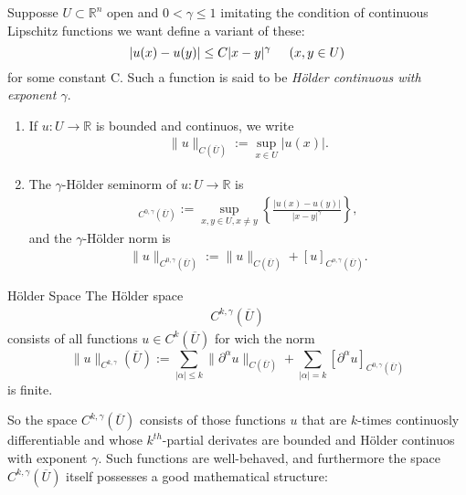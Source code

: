 Supposse $U\subset \mathbb{R}^{n}$ open and $0<\gamma\leq 1$ imitating the condition of continuous Lipschitz functions we want define a variant of these:
\begin{equation}
  |u(x)-u(y)|\leq C|x-y|^{\gamma}\hspace{0.5cm}(x,y\in U)\label{eq:holder_condition}
\end{equation}
for some constant C. Such a function is said to be \textit{Hölder continuous with exponent $\gamma$}.
\begin{definition}{}
  \begin{enumerate}
    \item If $u:U\to \mathbb{R}$ is bounded and continuos, we write
      \begin{align*}
        \|u\|_{C(\overline{U})}:=\sup_{x\in U}|u(x)|.
      \end{align*}
    \item The $\gamma$-Hölder seminorm of $u:U\to\mathbb{R}$ is
      \begin{align*}
        [u]_{C^{0,\gamma}(\overline{U})}:=\sup_{x,y\in U, x\neq y}\left\{\frac{|u(x)-u(y)|}{|x-y|^{\gamma}}\right\},
      \end{align*}
      and the $\gamma$-Hölder norm is
      \begin{align*}
        \|u\|_{C^{0,\gamma}(\overline{U})}:=\|u\|_{C(\overline{U})}+[u]_{C^{o,\gamma}(\overline{U})}.
      \end{align*}
  \end{enumerate}
\end{definition}
\begin{definition}{Hölder Space}
  The Hölder space
  \begin{align*}
    C^{k,\gamma}(\overline{U})
  \end{align*}
  consists of all functions $u\in C^{k}(\overline{U})$ for wich the norm
  \begin{equation}\label{eq:hölder_norm_ck}
    \|u\|_{C^{k,\gamma}}(\overline{U}):=\sum_{|\alpha|\leq k}\|\partial^{\alpha}u\|_{C(\overline{U})}+\sum_{|\alpha|=k}[\partial^{\alpha}u]_{C^{0,\gamma}(\overline{U})}
  \end{equation}
  is finite.
\end{definition}
So the space $C^{k,\gamma}(\overline{U})$ consists of those functions $u$ that are $k$-times continuosly differentiable and whose $k^{th}$-partial derivates are bounded and Hölder continuos with exponent $\gamma$. Such functions are well-behaved, and furthermore the space $C^{k,\gamma}(\overline{U})$ itself possesses a good mathematical structure:
